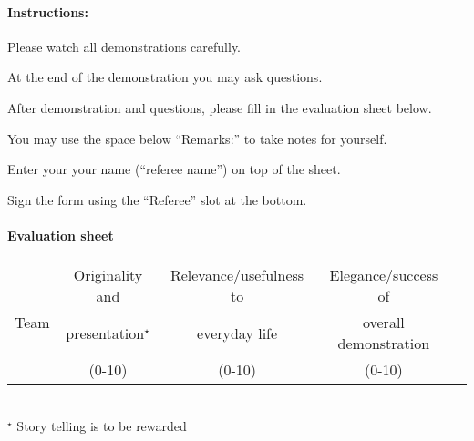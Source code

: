 \paragraph{Instructions:}
\begin{compactenum}
\item Please watch all demonstrations carefully.
\item At the end of the demonstration you may ask questions.
\item After demonstration and questions, please fill in the evaluation sheet below.
\item You may use the space below \enquote{Remarks:} to take notes for yourself.
\item Enter your your name (\enquote{referee name}) on top of the sheet.
\item Sign the form using the \enquote{Referee} slot at the bottom.
\end{compactenum}


\paragraph{Evaluation sheet}
\begin{center}

\begingroup
\newcommand\tableTEAMS{}
\def\do#1{\appto\tableTEAMS{#1 & & &  \\\hline}}%
\expandafter\docsvlist\expandafter{\TEAMSFINALS}

\begin{tabular}{|l|c|c|c|c|}
  \hline
  \multirow{3}{*}{Team}
  & Originality and        &  Relevance/usefulness to  &  Elegance/success of   \\
  & presentation${}^\star$ &  everyday life            &  overall demonstration \\
  & (0-10)                 &  (0-10)                   &  (0-10)                \\
  \hline
  \hline
  \tableTEAMS
\end{tabular}\\
${}^\star$ Story telling is to be rewarded
\endgroup
\end{center}


